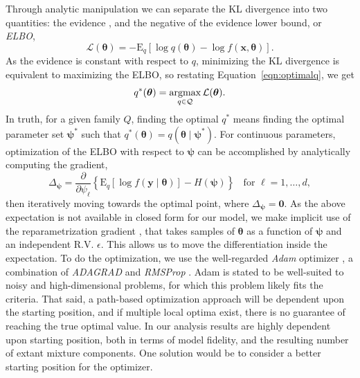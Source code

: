 Through analytic manipulation we can separate the KL divergence into two quantities: the evidence
    , and the negative of the evidence lower bound, or \emph{ELBO},
    \begin{equation}
        \label{eqn:elbo}
        \mathcal{L}(\bm{\theta}) = 
            -\text{E}_q\left[\log q(\bm{\theta}) - \log f(\bm{x},\bm{\theta})\right].
    \end{equation}
    As the evidence is constant with respect to $q$, minimizing the KL divergence is equivalent to
    maximizing the ELBO, so restating Equation~\eqref{eqn:optimalq}, we get
    \begin{equation}
        \label{eqn:optimalq2}
        q^*(\bm{\theta}) = \operatorname*{argmax}_{q\in\mathcal{Q}} \mathcal{L}(\bm{\theta}).
    \end{equation}
    In truth, for a given family $Q$, finding the optimal $q^*$ means finding the optimal parameter set 
    $\bm{\psi}^*$ such that $q^*(\bm{\theta}) = q(\bm{\theta}\mid\bm{\psi}^*)$.
    For continuous parameters, optimization of the ELBO with respect to $\bm{\psi}$ can be 
    accomplished by analytically computing the gradient,
    \begin{equation}
        \label{eqn:gradient}
        \Delta_{\bm{\psi}} = \frac{\partial}{\partial \psi_{\ell}}
            \left\lbrace\text{E}_{q}\left[\log f(\bm{y}\mid\bm{\theta})\right] 
                - H(\bm{\psi})\right\rbrace
            \;\;\text{ for }\ell = 1,\ldots,d, 
    \end{equation}
    then iteratively moving towards the optimal point, where $\Delta_{\bm{\psi}} = \bm{0}$.  
    As the above expectation is not available in closed form for our model, we make implicit 
    use of the reparametrization gradient \citep{kingma2022}, that takes samples of $\bm{\theta}$ 
    as a function of $\bm{\psi}$ and an independent R.V. $\epsilon$.  This allows us to move
    the differentiation inside the expectation. To do the optimization, 
    we use the well-regarded \emph{Adam} optimizer \citep{kingma2017}, a combination of 
    \emph{ADAGRAD} \citep{duchi2011} and \emph{RMSProp} \citep{tieleman2012}.  Adam is stated to be 
    well-suited to noisy and high-dimensional problems, for which this problem likely fits the criteria.
    That said, a path-based optimization approach will be dependent upon the starting position,
    and if multiple local optima exist, there is no guarantee of reaching the
    true optimal value.  In our analysis results are highly dependent upon starting position, 
    both in terms of model fidelity, and the resulting number of extant mixture components.  
    One solution would be to consider a better starting position for the optimizer. 


